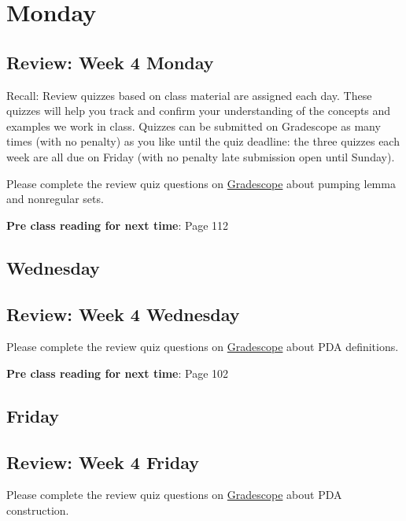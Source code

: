 

\section*{Monday}


    
\subsection*{Review: Week 4 Monday}


Recall: Review quizzes based on class material are assigned each day. 
These quizzes will help you track and confirm your understanding of the concepts and examples 
we work in class. Quizzes can be submitted on Gradescope as many times (with no penalty) as 
you like until the quiz deadline: the three quizzes each week are all due on Friday (with no penalty 
late submission open until Sunday).

Please complete the review quiz questions on \href{http://gradescope.com}{Gradescope} about 
pumping lemma and nonregular sets.

{\bf Pre class reading for next time}: Page 112


\newpage
\subsection*{Wednesday}



\subsection*{Review: Week 4 Wednesday}

Please complete the review quiz questions on \href{http://gradescope.com}{Gradescope} about 
PDA definitions.

{\bf Pre class reading for next time}: Page 102



\newpage
\subsection*{Friday}



\newpage
\subsection*{Review: Week 4 Friday}


Please complete the review quiz questions on \href{http://gradescope.com}{Gradescope} about 
PDA construction.


